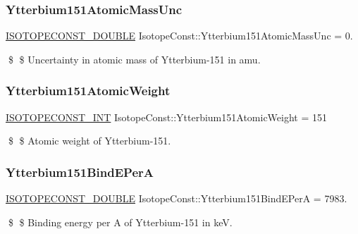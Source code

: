 \subsubsection{\texorpdfstring{Ytterbium151\+Atomic\+Mass\+Unc}{Ytterbium151AtomicMassUnc}}
{\footnotesize\ttfamily \mbox{\hyperlink{group___isotope_const-_macros_ga8f45a7272ce02c0b4c65c44636ed719a}{I\+S\+O\+T\+O\+P\+E\+C\+O\+N\+S\+T\+\_\+\+D\+O\+U\+B\+LE}} Isotope\+Const\+::\+Ytterbium151\+Atomic\+Mass\+Unc = 0.}

\$ \$ Uncertainty in atomic mass of Ytterbium-\/151 in amu. \mbox{\label{group___isotope_const-_ytterbium-_yb151_ga06d4c6a2f1e29787a446ff6c21f69197}} 
\subsubsection{\texorpdfstring{Ytterbium151\+Atomic\+Weight}{Ytterbium151AtomicWeight}}
{\footnotesize\ttfamily \mbox{\hyperlink{group___isotope_const-_macros_ga5f18360b3e99483a35c32d789e62621c}{I\+S\+O\+T\+O\+P\+E\+C\+O\+N\+S\+T\+\_\+\+I\+NT}} Isotope\+Const\+::\+Ytterbium151\+Atomic\+Weight = 151}

\$ \$ Atomic weight of Ytterbium-\/151. \mbox{\label{group___isotope_const-_ytterbium-_yb151_ga40ed92013c5830d158923b4170fda5d1}} 
\subsubsection{\texorpdfstring{Ytterbium151\+Bind\+E\+PerA}{Ytterbium151BindEPerA}}
{\footnotesize\ttfamily \mbox{\hyperlink{group___isotope_const-_macros_ga8f45a7272ce02c0b4c65c44636ed719a}{I\+S\+O\+T\+O\+P\+E\+C\+O\+N\+S\+T\+\_\+\+D\+O\+U\+B\+LE}} Isotope\+Const\+::\+Ytterbium151\+Bind\+E\+PerA = 7983.}

\$ \$ Binding energy per A of Ytterbium-\/151 in keV. \mbox{\label{group___isotope_const-_ytterbium-_yb151_gacecd8dbcead1e2fe8616304ffa976ebb}} 
